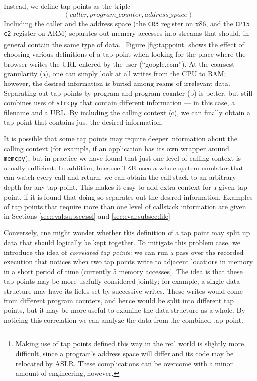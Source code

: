 Instead, we define tap points as the triple
\[ (caller, program\_counter, address\_space) \]
Including the caller and the address space (the \texttt{CR3} register on
x86, and the \texttt{CP15 c2} register on ARM) separates out memory
accesses into streams that should, in general contain the same type of
data.\footnote{Making use of tap points defined this way in the real
world is slightly more difficult, since a program's address space will
differ and its code may be relocated by ASLR. These complications can be
overcome with a minor amount of engineering, however.} Figure
\ref{fig:tappoint} shows the effect of choosing various definitions of a
tap point when looking for the place where the browser writes the URL
entered by the user (``google.com''). At the coarsest granularity (a),
one can simply look at all writes from the CPU to RAM; however, the
desired information is buried among reams of irrelevant data.
Separating out tap points by program and program counter (b) is better,
but still combines uses of \texttt{strcpy} that contain different
information --- in this case, a filename and a URL. By including the
calling context (c), we can finally obtain a tap point that contains
just the desired information.

It is possible that some tap points may require deeper information about
the calling context (for example, if an application has its own wrapper
around \texttt{memcpy}), but in practice we have found that just one
level of calling context is usually sufficient. In addition, because TZB
uses a whole-system emulator that can watch every call and return, we
can obtain the call stack to an arbitrary depth for any tap point. This
makes it easy to add extra context for a given tap point, if it is found
that doing so separates out the desired information. Examples of tap
points that require more than one level of callstack information are
given in Sections \ref{sec:eval:subsec:ssl} and
\ref{sec:eval:subsec:file}.

Conversely, one might wonder whether this definition of a tap point may
split up data that should logically be kept together. To mitigate this
problem case, we introduce the idea of \emph{correlated tap points}: we
can run a pass over the recorded execution that notices when two tap
points write to adjacent locations in memory in a short period of time
(currently 5 memory accesses). The idea is that these tap points may be
more usefully considered jointly; for example, a single data structure
may have its fields set by successive writes. These writes would come
from different program counters, and hence would be split into different
tap points, but it may be more useful to examine the data structure as a
whole. By noticing this correlation we can analyze the data from the
combined tap point.
